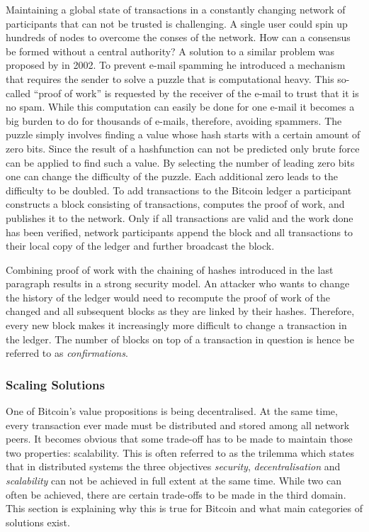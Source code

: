 \documentclass[final]{fhnwreport}       %
\begin{document}
Maintaining a global state of transactions in a constantly changing network of participants that can not be trusted is challenging. A single user could spin up hundreds of nodes to overcome the conses of the network. How can a consensus be formed without a central authority? A solution to a similar problem was proposed by \textcite{back_hashcash_2002} in 2002. To prevent e-mail spamming he introduced a mechanism that requires the sender to solve a puzzle that is computational heavy. This so-called ``proof of work'' is requested by the receiver of the e-mail to trust that it is no spam. While this computation can easily be done for one e-mail it becomes a big burden to do for thousands of e-mails, therefore, avoiding spammers. The puzzle simply involves finding a value whose \gls{hash} starts with a certain amount of zero bits. Since the result of a \gls{hashfunction} can not be predicted only brute force can be applied to find such a value. By selecting the number of leading zero bits one can change the difficulty of the puzzle. Each additional zero leads to the difficulty to be doubled. To add transactions to the Bitcoin ledger a participant constructs a block consisting of transactions, computes the proof of work, and publishes it to the network. Only if all transactions are valid and the work done has been verified, network participants append the block and all transactions to their local copy of the ledger and further broadcast the block.

Combining proof of work with the chaining of hashes introduced in the last paragraph results in a strong security model. An attacker who wants to change the history of the ledger would need to recompute the proof of work of the changed and all subsequent blocks as they are linked by their hashes. Therefore, every new block makes it increasingly more difficult to change a transaction in the ledger. The number of blocks on top of a transaction in question is hence be referred to as \emph{confirmations}.  

\subsubsection{Scaling Solutions}
One of Bitcoin's value propositions is being decentralised. At the same time, every transaction ever made must be distributed and stored among all network peers. It becomes obvious that some trade-off has to be made to maintain those two properties: scalability. This is often referred to as the \gls{trilemma} which states that in distributed systems the three objectives \emph{security}, \emph{decentralisation} and \emph{scalability} can not be achieved in full extent at the same time. While two can often be achieved, there are certain trade-offs to be made in the third domain. This section is explaining why this is true for Bitcoin and what main categories of solutions exist.
\end{document}

